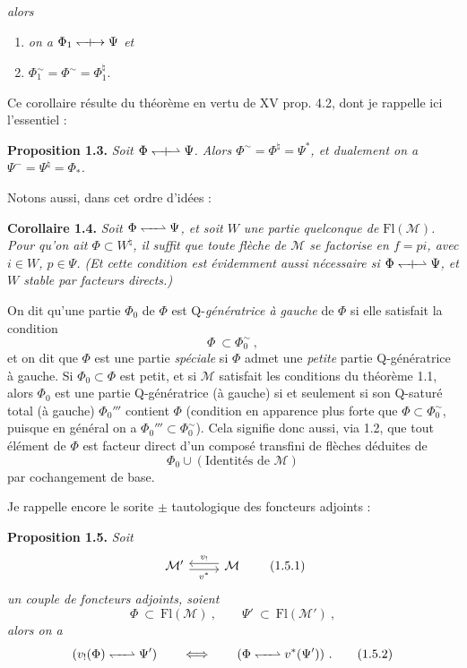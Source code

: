 \documentclass[11pt]{article}
\newcommand{\printedpage}[1]{\marginpar{\footnotesize p.~#1}}
\newcommand{\msp}[1]{\marginpar{\footnotesize [#1]}}
\newcommand{\Qorth}{\mathrel{\leftharpoondown\mkern-6mu\relbar\mkern-6mu\rightharpoonup}}
\newcommand{\Qorthx}{\mathrel{\leftharpoondown\mkern-9mu{+}\mkern-9mu\rightharpoonup}}
\newcommand{\Qorthxfull}{\mathrel{\leftharpoondown\mkern-9mu{+}\mkern-9mu\rightarrow}}
\begin{document}
\printedpage{4}

\msp{page 6}
\textit{alors}
\begin{enumerate}[label={}]
\item[a)] \textit{on a $\Phi_1 \Qorthxfull \Psi$ et} %
\item[b)] $\Phi_1^{\sim} = \Phi^{\sim} = \Phi_1^{\natural}$.
\end{enumerate}
Ce corollaire résulte du théorème en vertu de XV prop. 4.2, dont je rappelle ici l'essentiel :

\textbf{Proposition 1.3.} \textit{Soit $\Phi \Qorthx \Psi$. Alors $\Phi^{\sim} = \Phi^{\natural} = \Psi^{*}$, et dualement on a $\Psi^{-} = \Psi^{\natural} = \Phi_{*}$.}

Notons aussi, dans cet ordre d'idées :

\textbf{Corollaire 1.4.} \textit{Soit $\Phi \Qorth \Psi$, et soit $W$ une partie quelconque de $\mathrm{Fl}(\mathcal{M})$. Pour qu'on ait $\Phi \subset W^{\natural}$, il suffit que toute flèche de $\mathcal{M}$ se factorise en $f = pi$, avec $i \in W$, $p \in \Psi$. (Et cette condition est évidemment aussi nécessaire si $\Phi \Qorthx \Psi$, et $W$ stable par facteurs directs.)}

On dit qu'une partie $\Phi_0$ de $\Phi$ est Q-\textit{génératrice à gauche} de $\Phi$ si elle satisfait la condition
\[
\Phi \ \subset \Phi_0^{\sim}\ , \tag*{(1.9)}
\]
et on dit que $\Phi$ est une partie \textit{spéciale} si $\Phi$ admet une \textit{petite} partie Q-génératrice à gauche. Si $\Phi_0 \subset \Phi$ est petit, et si $\mathcal{M}$ satisfait les conditions du théorème 1.1, alors $\Phi_0$ est une partie Q-génératrice (à gauche) si et seulement si son Q-saturé total (à gauche) $\Phi_0'''$ contient $\Phi$ (condition en apparence plus forte que $\Phi \subset \Phi_0^{\sim}$, puisque en général on a $\Phi_0''' \subset \Phi_0^{\sim}$). Cela signifie donc aussi, via 1.2, que tout \msp{page 7} élément de $\Phi$ est facteur direct d'un composé transfini de flèches déduites de
\[
\Phi_0 \cup (\text{Identités de } \mathcal{M})
\]
par cochangement de base.

Je rappelle encore le sorite $\pm$ tautologique des foncteurs adjoints :

\textbf{Proposition 1.5.} \textit{Soit}
\[
\begin{tikzcd}
\mathcal{M}' \arrow[r, shift right=1, "v^{*}"'] & \mathcal{M} \arrow[l, shift right=1, "v_{!}"']
\end{tikzcd}
\tag*{(1.5.1)}
\]
\textit{un couple de foncteurs adjoints, soient}
\[
\Phi \ \subset\ \mathrm{Fl}(\mathcal{M})\ , \qquad \Psi' \ \subset\ \mathrm{Fl}(\mathcal{M}')\ ,
\]
\textit{alors on a}
\[
(v_{!}(\Phi) \Qorth \Psi') \qquad \Longleftrightarrow \qquad (\Phi \Qorth v^{*}(\Psi'))\ . \tag*{(1.5.2)}
\]
\end{document}
